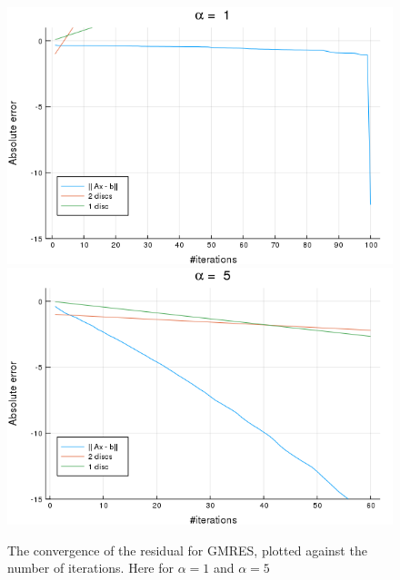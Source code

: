 \begin{figure}[h!]
\centering
\includegraphics[scale=0.4]{../task2/images/Task2_ab_a1_conv.png}
\includegraphics[scale=0.4]{../task2/images/Task2_ab_a5_conv.png}
\caption{The convergence of the residual for GMRES, plotted against the number of iterations. Here for $\alpha=1$ and $\alpha=5$}
\label{fig:task2a_1_5}
\end{figure}
